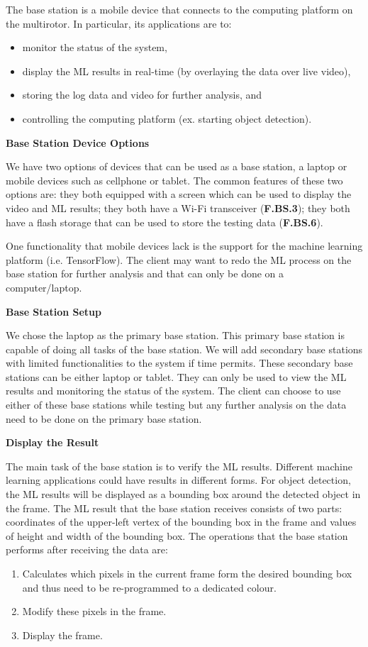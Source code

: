 The base station is a mobile device that connects to the computing platform on the multirotor. In particular, its applications are to:
\begin{itemize}
    \item monitor the status of the system,
    \item display the ML results in real-time (by overlaying the data over live video),
    \item storing the log data and video for further analysis, and
    \item controlling the computing platform (ex. starting object detection).
\end{itemize}

\textbf{Base Station Device Options}

We have two options of devices that can be used as a base station, a laptop or mobile devices such as cellphone or tablet. The common features of these two options are: they both equipped with a screen which can be used to display the video and ML results; they both have a Wi-Fi transceiver (\textbf{F.BS.3}); they both have a flash storage that can be used to store the testing data (\textbf{F.BS.6}).

One functionality that mobile devices lack is the support for the machine learning platform (i.e. TensorFlow). The client may want to redo the ML process on the base station for further analysis and that can only be done on a computer/laptop.

\textbf{Base Station Setup}

We chose the laptop as the primary base station. This primary base station is capable of doing all tasks of the base station. We will add secondary base stations with limited functionalities to the system if time permits. These secondary base stations can be either laptop or tablet. They can only be used to view the ML results and monitoring the status of the system. The client can choose to use either of these base stations while testing but any further analysis on the data need to be done on the primary base station.

\textbf{Display the Result}

The main task of the base station is to verify the ML results. Different machine learning applications could have results in different forms. For object detection, the ML results will be displayed as a bounding box around the detected object in the frame. The ML result that the base station receives consists of two parts: coordinates of the upper-left vertex of the bounding box in the frame and values of height and width of the bounding box. The operations that the base station performs after receiving the data are:
\begin{enumerate}
    \item Calculates which pixels in the current frame form the desired bounding box and thus need to be re-programmed to a dedicated colour.
    \item Modify these pixels in the frame.
    \item Display the frame.
\end{enumerate}

